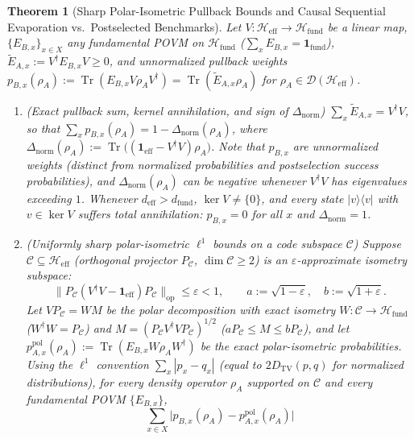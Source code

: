 \documentclass[11pt,a4paper]{article}
\newtheorem{theorem}{Theorem}
\theoremstyle{definition}
\theoremstyle{remark}
\newcommand{\Tr}{\operatorname{Tr}}
\newcommand{\cH}{\mathcal{H}}
\newcommand{\cC}{\mathcal{C}}
\newcommand{\cD}{\mathcal{D}}
\newcommand{\1}{\mathbf{1}}
\newcommand{\normOp}[1]{\|#1\|_{\mathrm{op}}}
\begin{document}
\begin{theorem}[Sharp Polar-Isometric Pullback Bounds and Causal Sequential Evaporation vs.\ Postselected Benchmarks]\label{thm:nonisometric}
Let $V:\cH_{\mathrm{eff}}\to\cH_{\mathrm{fund}}$ be a linear map, $\{E_{B,x}\}_{x\in X}$ any fundamental POVM on $\cH_{\mathrm{fund}}$ ($\sum_x E_{B,x}=\1_{\mathrm{fund}}$), $\tilde{E}_{A,x}:=V^\dagger E_{B,x} V\ge 0$, and unnormalized pullback weights $p_{B,x}(\rho_A):=\Tr(E_{B,x}V\rho_A V^\dagger)=\Tr(\tilde{E}_{A,x}\rho_A)$ for $\rho_A\in\cD(\cH_{\mathrm{eff}})$.
\begin{enumerate}
  \item[(a)] \emph{(Exact pullback sum, kernel annihilation, and sign of $\Delta_{\mathrm{norm}}$)} $\sum_x\tilde{E}_{A,x}=V^\dagger V$, so that $\sum_x p_{B,x}(\rho_A)=1-\Delta_{\mathrm{norm}}(\rho_A)$, where $\Delta_{\mathrm{norm}}(\rho_A):=\Tr\bigl((\1_{\mathrm{eff}}-V^\dagger V)\rho_A\bigr)$. Note that $p_{B,x}$ are unnormalized weights (distinct from normalized probabilities and postselection success probabilities), and $\Delta_{\mathrm{norm}}(\rho_A)$ can be negative whenever $V^\dagger V$ has eigenvalues exceeding $1$. Whenever $d_{\mathrm{eff}}>d_{\mathrm{fund}}$, $\ker V\neq\{0\}$, and every state $|v\rangle\langle v|$ with $v\in\ker V$ suffers total annihilation: $p_{B,x}=0$ for all $x$ and $\Delta_{\mathrm{norm}}=1$.
  \item[(b)] \emph{(Uniformly sharp polar-isometric $\ell^1$ bounds on a code subspace $\cC$)} Suppose $\cC\subseteq\cH_{\mathrm{eff}}$ (orthogonal projector $P_\cC$, $\dim\cC\ge 2$) is an $\varepsilon$-approximate isometry subspace:
  \begin{equation}\label{eq:approx-iso}
    \normOp{P_\cC(V^\dagger V - \1_{\mathrm{eff}})P_\cC} \le \varepsilon < 1,
    \qquad
    a := \sqrt{1-\varepsilon},\quad b := \sqrt{1+\varepsilon}.
  \end{equation}
  Let $V P_\cC = W M$ be the polar decomposition with exact isometry $W:\cC\to\cH_{\mathrm{fund}}$ ($W^\dagger W=P_\cC$) and $M=(P_\cC V^\dagger V P_\cC)^{1/2}$ ($a P_\cC \le M \le b P_\cC$), and let $p_{A,x}^{\mathrm{pol}}(\rho_A):=\Tr(E_{B,x}W\rho_A W^\dagger)$ be the exact polar-isometric probabilities. Using the $\ell^1$ convention $\sum_x|p_x-q_x|$ (equal to $2 D_{\mathrm{TV}}(p,q)$ for normalized distributions), for \emph{every} density operator $\rho_A$ supported on $\cC$ and \emph{every} fundamental POVM $\{E_{B,x}\}$,
  \begin{equation}\label{eq:polar-sharp-unnorm}
    \sum_{x\in X}\bigl|p_{B,x}(\rho_A) - p_{A,x}^{\mathrm{pol}}(\rho_A)\bigr|

\end{equation}
\end{enumerate}
\end{theorem}
\end{document}

